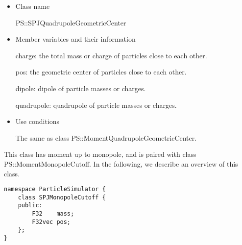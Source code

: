 \begin{itemize}
\item Class name

  PS::SPJQuadrupoleGeometricCenter

\item Member variables and their information

  charge: the total mass or charge of particles close to each other.

  pos: the geometric center of particles close to each other.

  dipole: dipole of particle masses or charges.

  quadrupole: quadrupole of particle masses or charges.

\item Use conditions

  The same as class PS::MomentQuadrupoleGeometricCenter.

\end{itemize}



This class has moment up to monopole, and is paired with class
PS::MomentMonopoleCutoff. In the following, we describe an overview of
this class.
\begin{screen}
\begin{verbatim}
namespace ParticleSimulator {
    class SPJMonopoleCutoff {
    public:
        F32    mass;
        F32vec pos;
    };
}
\end{verbatim}
\end{screen}

